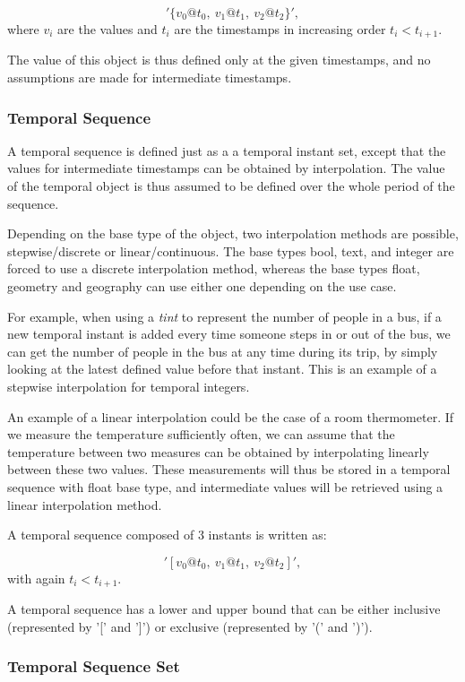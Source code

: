 \[
    '\{v_0@t_0,\ v_1@t_1,\ v_2@t_2\}',
\]
where \(v_i\) are the values and \(t_i\) are the timestamps in increasing order \(t_i < t_{i+1}\).

The value of this object is thus defined only at the given timestamps, and no assumptions are made for intermediate timestamps.

\subsubsection{Temporal Sequence}
\label{section:mobilitydb_seq}

A temporal sequence is defined just as a a temporal instant set, except that the values for intermediate timestamps can be obtained by interpolation. The value of the temporal object is thus assumed to be defined over the whole period of the sequence.

Depending on the base type of the object, two interpolation methods are possible, stepwise/discrete or linear/continuous. The base types bool, text, and integer are forced to use a discrete interpolation method, whereas the base types float, geometry and geography can use either one depending on the use case.

For example, when using a \textit{tint} to represent the number of people in a bus, if a new temporal instant is added every time someone steps in or out of the bus, we can get the number of people in the bus at any time during its trip, by simply looking at the latest defined value before that instant. This is an example of a stepwise interpolation for temporal integers.

An example of a linear interpolation could be the case of a room thermometer. If we measure the temperature sufficiently often, we can assume that the temperature between two measures can be obtained by interpolating linearly between these two values. These measurements will thus be stored in a temporal sequence with float base type, and intermediate values will be retrieved using a linear interpolation method.

A temporal sequence composed of 3 instants is written as:

\[
    '[v_0@t_0,\ v_1@t_1,\ v_2@t_2]',
\]
with again \(t_i < t_{i+1}\).

A temporal sequence has a lower and upper bound that can be either inclusive (represented by '[' and ']') or exclusive (represented by '(' and ')').

\subsubsection{Temporal Sequence Set}
\label{section:mobilitydb_s}

